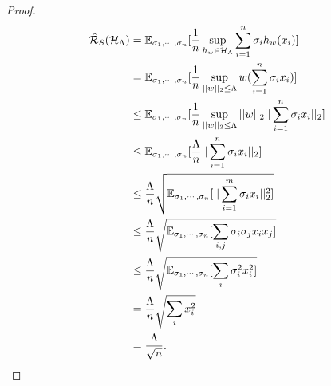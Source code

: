 \documentclass[../main.tex]{subfiles}
\begin{document}
	\begin{proof}
		\begin{equation*}
			\begin{aligned}
				\hat{\mathcal{R}}_S(\mathcal{H}_{\Lambda}) & = \mathbb{E}_{\sigma_1, \cdots, \sigma_n} [\frac{1}{n} \sup\limits_{h_w \in \mathcal{H}_{\Lambda}} \sum\limits_{i=1}^n \sigma_i h_w(x_i)] \\
				& = \mathbb{E}_{\sigma_1, \cdots, \sigma_n} [\frac{1}{n} \sup\limits_{||w||_2\leq \Lambda } w(\sum\limits_{i=1}^n \sigma_i x_i)]\\
				& \leq \mathbb{E}_{\sigma_1, \cdots, \sigma_n} [\frac{1}{n} \sup\limits_{||w||_2\leq \Lambda } ||w||_2 ||\sum\limits_{i=1}^n \sigma_i x_i||_2] \\
				& 	\leq \mathbb{E}_{\sigma_1, \cdots, \sigma_n} [\frac{\Lambda}{n}  ||\sum\limits_{i=1}^n \sigma_i x_i||_2] \\
				& 	\leq \frac{\Lambda}{n}   \sqrt{\mathbb{E}_{\sigma_1, \cdots, \sigma_n} [||\sum\limits_{i=1}^m \sigma_i x_i||^2_2]} \\	
				& 	\leq \frac{\Lambda}{n}   \sqrt{\mathbb{E}_{\sigma_1, \cdots, \sigma_n} [\sum\limits_{i,j} \sigma_i \sigma_j x_i x_j]} \\
			& 	\leq \frac{\Lambda}{n}   \sqrt{\mathbb{E}_{\sigma_1, \cdots, \sigma_n} [\sum\limits_{i} \sigma_i^2 x_i^2]} \\	
			& 	= \frac{\Lambda}{n}   \sqrt{\sum\limits_{i}  x_i^2} \\	
						& 	= \frac{\Lambda}{\sqrt{n}} .									
			\end{aligned}
		\end{equation*}
	\end{proof}
\end{document}

